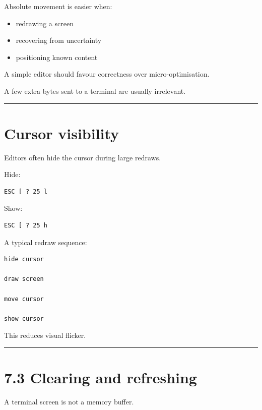 \documentclass[
  oneside,
  openany]{book}
\providecommand{\tightlist}{%
  \setlength{\itemsep}{0pt}\setlength{\parskip}{0pt}}
\begin{document}
Absolute movement is easier when:

\begin{itemize}
\tightlist
\item
  redrawing a screen
\item
  recovering from uncertainty
\item
  positioning known content
\end{itemize}

A simple editor should favour correctness over micro-optimisation.

A few extra bytes sent to a terminal are usually irrelevant.

\begin{center}\rule{0.5\linewidth}{0.5pt}\end{center}

\hypertarget{cursor-visibility}{%
\section{Cursor visibility}\label{cursor-visibility}}

Editors often hide the cursor during large redraws.

Hide:

\begin{verbatim}
ESC [ ? 25 l
\end{verbatim}

Show:

\begin{verbatim}
ESC [ ? 25 h
\end{verbatim}

A typical redraw sequence:

\begin{verbatim}
hide cursor

draw screen

move cursor

show cursor
\end{verbatim}

This reduces visual flicker.

\begin{center}\rule{0.5\linewidth}{0.5pt}\end{center}

\hypertarget{clearing-and-refreshing}{%
\section{7.3 Clearing and refreshing}\label{clearing-and-refreshing}}

A terminal screen is not a memory buffer.
\end{document}
